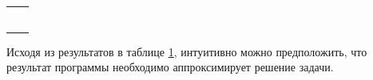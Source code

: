 \begin{table}
\begin{tabularx}{1.0\textwidth}{| >{\raggedright\arraybackslash}X |
	>{\raggedright\arraybackslash}X |}
		\centering{(60,0004; -60)} & \centering{6.23635462E-004}
		\tabularnewline \hline
		
		\centering{(80,0002; -60)} & \centering{2.70511050E-004}
		\tabularnewline \hline
		
		
		\centering{(0,001; -80)} & \centering{-1.09467887E-003} \tabularnewline \hline
		
		\centering{(20,0008; -80)} & \centering{-4.98291674E-004}
		\tabularnewline \hline
		
		\centering{(40,0006; -80)} & \centering{-2.78024921E-004} \tabularnewline \hline
		
		\centering{(60,0004; -80)} & \centering{-1.52325956E-004}
		\tabularnewline \hline
		
		\centering{(80,0002; -80)} & \centering{-6.60620166E-005}
		\tabularnewline \hline
		
	\end{tabularx}
	\label{tab:test3b}
\end{table}

Исходя из результатов в таблице \ref{tab:test3b}, интуитивно можно предположить, что результат программы необходимо аппроксимирует решение задачи. 